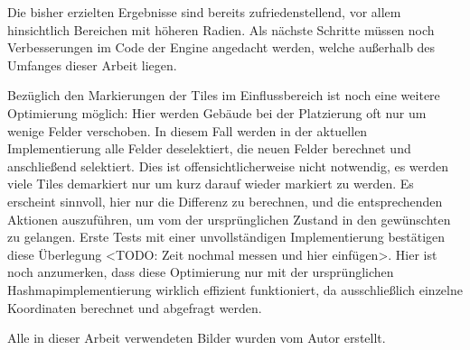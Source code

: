 \documentclass[%
			paper=a4,%
			DIV12,
			liststotoc,
			bibtotoc,
			draft=false,%
			titlepage,
			numbers=noendperiod
			]{scrartcl}
\begin{document}
Die bisher erzielten Ergebnisse sind bereits zufriedenstellend, vor allem hinsichtlich Bereichen mit höheren Radien. Als nächste Schritte müssen noch Verbesserungen im Code der Engine angedacht werden, welche außerhalb des Umfanges dieser Arbeit liegen.

Bezüglich den Markierungen der Tiles im Einflussbereich ist noch eine weitere Optimierung möglich:
Hier werden Gebäude bei der Platzierung oft nur um wenige Felder verschoben.
In diesem Fall werden in der aktuellen Implementierung alle Felder deselektiert, die neuen Felder berechnet und anschließend selektiert.
Dies ist offensichtlicherweise nicht notwendig, es werden viele Tiles demarkiert nur um kurz darauf wieder markiert zu werden. 
Es erscheint sinnvoll, hier nur die Differenz zu berechnen, und die entsprechenden Aktionen auszuführen, um vom der ursprünglichen Zustand in den gewünschten zu gelangen.
Erste Tests mit einer unvollständigen Implementierung bestätigen diese Überlegung <TODO: Zeit nochmal messen und hier einfügen>. 
Hier ist noch anzumerken, dass diese Optimierung nur mit der ursprünglichen Hashmapimplementierung wirklich effizient funktioniert, da ausschließlich einzelne Koordinaten berechnet und abgefragt werden. 


\clearpage

\newpage

\listoffigures

Alle in dieser Arbeit verwendeten Bilder wurden vom Autor erstellt.

\lstlistoflistings

\listoftables

\newpage

\nocite{*} %

\end{document}
